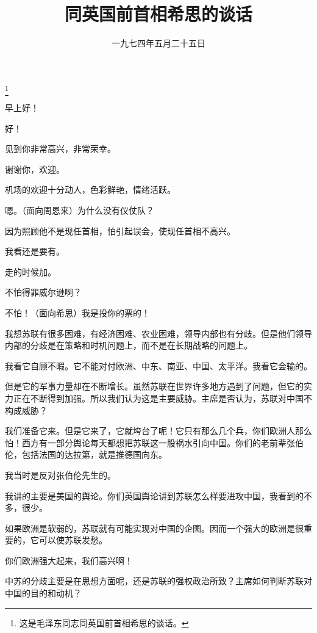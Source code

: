 
\title{同英国前首相希思的谈话}
\date{一九七四年五月二十五日}
\thanks{这是毛泽东同志同英国前首相希思的谈话。}
\maketitle


早上好！

好！

见到你非常高兴，非常荣幸。

谢谢你，欢迎。

机场的欢迎十分动人，色彩鲜艳，情绪活跃。

嗯。（面向周恩来）为什么没有仪仗队？

因为照顾他不是现任首相，怕引起误会，使现任首相不高兴。

我看还是要有。

走的时候加。

不怕得罪威尔逊啊？

不怕！（面向希思）我是投你的票的！

我想苏联有很多困难，有经济困难、农业困难，领导内部也有分歧。但是他们领导内部的分歧是在策略和时机问题上，而不是在长期战略的问题上。

我看它自顾不暇。它不能对付欧洲、中东、南亚、中国、太平洋。我看它会输的。

但是它的军事力量却在不断增长。虽然苏联在世界许多地方遇到了问题，但它的实力正在不断得到加强。所以我们认为这是主要威胁。主席是否认为，苏联对中国不构成威胁？

我们准备它来。但是它来了，它就垮台了呢！它只有那么几个兵，你们欧洲人那么怕！西方有一部分舆论每天都想把苏联这一股祸水引向中国。你们的老前辈张伯伦，包括法国的达拉第，就是推德国向东。

我当时是反对张伯伦先生的。

我讲的主要是美国的舆论。你们英国舆论讲到苏联怎么样要进攻中国，我看到的不多，很少。

如果欧洲是软弱的，苏联就有可能实现对中国的企图。因而一个强大的欧洲是很重要的，它可以使苏联发愁。

你们欧洲强大起来，我们高兴啊！

中苏的分歧主要是在思想方面呢，还是苏联的强权政治所致？主席如何判断苏联对中国的目的和动机？

